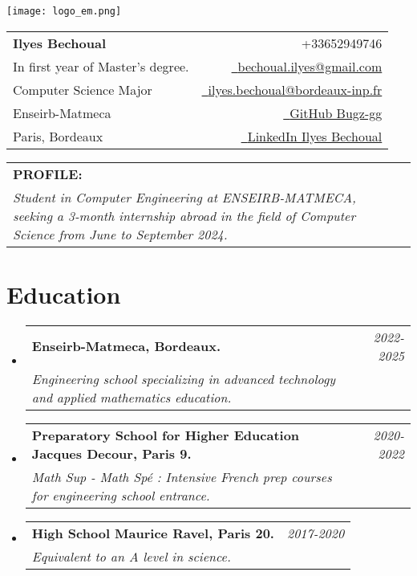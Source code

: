 \documentclass[a4paper,11pt]{article}
\makeatletter
\newcommand{\resumeSubheading}[4]{
\vspace{0.5mm}\item
    \begin{tabular*}{0.98\textwidth}[t]{l@{\extracolsep{\fill}}r}
        \textbf{#1} & \textit{\footnotesize{#4}} \\
        \textit{\footnotesize{#3}} &  \footnotesize{#2}\\
    \end{tabular*}
    \vspace{-2.4mm}
}
\newcommand{\profilesection}[2]{%
  \vspace{0.5mm}
  \begin{tabular*}{0.98\textwidth}[t]{l@{\extracolsep{\fill}}r}
    \textbf{#1} & \vspace{1mm} \\  
    \parbox{\linewidth}{\textit{\footnotesize #2}}
  \end{tabular*}
  \vspace{-2.4mm}
}
\newcommand{\resumeSubHeadingListStart}{\begin{itemize}[leftmargin=*,labelsep=0mm]}
\newcommand{\resumeSubHeadingListEnd}{\end{itemize}\vspace{2mm}}
\newcommand{\name}{Ilyes Bechoual} %
\newcommand{\course}{Computer Science Major} %
\newcommand{\phone}{652949746} %
\newcommand{\emaila}{bechoual.ilyes@gmail.com} %
\newcommand{\emailb}{ilyes.bechoual@bordeaux-inp.fr} %
\newcommand{\po}{\texttt{[image: logo\_em.jpg]}}
\newcommand{\pj}{\texttt{[image: jacdecour.jpg]}}
\newcommand{\pr}{\texttt{[image: Ravel.jpg]}}
\makeatother
\begin{document}
\selectfont 


\parbox{2.5cm}{%
\texttt{[image: logo\_em.png]}
}
\parbox{\dimexpr\linewidth-2.8cm\relax}{
\begin{tabularx}{\linewidth}{L r} \\
  \textbf{\Large \name} & {\raisebox{0.0\height}{\footnotesize \faPhone}\ +33\phone}\\
  {In first year of Master's degree.} & \href{mailto:\emaila}{\raisebox{0.0\height}{\footnotesize \faEnvelope}\ {\emaila}} \\
  \course &  \href{mailto:\emailb}{\raisebox{0.0\height}{\footnotesize \faEnvelope}\ {\emailb}}\\
  {Enseirb-Matmeca} &  \href{https://github.com/Bugz-gg}{\raisebox{0.0\height}{\footnotesize \faGithub}\ {GitHub Bugz-gg}} \\
  {Paris, Bordeaux} & \href{https://www.linkedin.com/in/ilyes-bechoual/}{\raisebox{0.0\height}{\footnotesize \faLinkedin}\ {LinkedIn Ilyes Bechoual}}
\end{tabularx}
}



\vspace{4mm}
\profilesection{PROFILE:}{Student in Computer Engineering at ENSEIRB-MATMECA, seeking a 3-month internship abroad in the field of Computer Science from June to September 2024.}

%

\section{\textbf{Education}}
  \resumeSubHeadingListStart
  \resumeSubheading
      { Enseirb-Matmeca, Bordeaux. \hspace{9.7cm}\raisebox{-0.3\height}{\po}}{}
      {Engineering school specializing in advanced technology and applied mathematics education.}{2022-2025}
    \resumeSubheading
      { Preparatory School for Higher Education Jacques Decour, Paris 9. \hspace{3.6cm}\raisebox{-0.3\height}{\pj}}{}
      {Math Sup - Math Spé : Intensive French prep courses for engineering school entrance.}{2020-2022}
    \resumeSubheading
      { High School Maurice Ravel, Paris 20. \hspace{8.3cm}\raisebox{-0.3\height}{\pr}}{}
      {Equivalent to an A level in science.}{2017-2020}
  \resumeSubHeadingListEnd
\vspace{-5.5mm}
%
\end{document}
